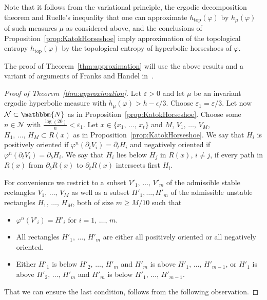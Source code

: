\documentclass[10pt,a4paper]{amsart}
\numberwithin{equation}{section}
\newcommand{\N}{\mathbbm{N}}
\newcommand{\topo}{\mathrm{top}}
\newcommand{\clN}{\mathcal{N}}
\theoremstyle{definition}
\theoremstyle{remark}
\begin{document}
Note that it follows from the variational principle, the ergodic decomposition theorem and Ruelle's inequality that one can approximate $h_{\topo}(\varphi)$ by $h_{\mu}(\varphi)$ of such measures $\mu$ as considered above, and the conclusions of Proposition~\ref{prop:KatokHorseshoe} imply approximation of the topological entropy $h_{\topo}(\varphi)$ by the topological entropy of hyperbolic horseshoes of $\varphi$.


The proof of Theorem~\ref{thm:approximation} will use the above results and a variant of arguments of Franks and Handel in~\cite{FranksHandel1988}.

\begin{proof}[Proof of Theorem~\ref{thm:approximation}]
Let $\varepsilon>0$ and let $\mu$ be an invariant ergodic hyperbolic measure with $h_{\mu}(\varphi) > h - \epsilon/3$. Choose $\varepsilon_1 = \varepsilon/3$. Let now $\clN\subset \N$ as in Proposition~\ref{prop:KatokHorseshoe}. Choose some $n\in \clN$ with $\frac{ \log(20)}{n} < \varepsilon_1$. Let $x \in \{x_1,\, \ldots,\, x_t\}$ and $M$, $V_1,\, \ldots,\, V_M$, $H_1,\, \ldots,\, H_M \subset R(x)$ as in Proposition~\ref{prop:KatokHorseshoe}. We say that $H_i$ is positively oriented if $\varphi^n(\partial_t V_i) = \partial_t H_i$ and negatively oriented if $\varphi^n(\partial_t V_i) = \partial_b H_i$. We say that $H_i$ lies below $H_j$ in $R(x)$, $i\neq j$, if every path in $R(x)$ from $\partial_b R(x)$ to $\partial_t R(x)$ intersects first $H_i$.


For convenience we restrict to a subset $V'_1,\, \ldots,\, V'_m$ of the admissible stable rectangles $V_1, \,\ldots,\, V_M$ as well as a subset $H'_1, \ldots, H'_m$ of the admissible unstable rectangles \linebreak $H_1,\, \ldots,\, H_M$, both of size $m\geq M/10$ such that
\begin{itemize}
\item $\varphi^n(V'_i) = H'_i$ for $i=1, \,\ldots,\, m$.
\item All rectangles $H'_1,\, \ldots,\, H'_m$ are either all positively oriented or all negatively oriented.
\item Either $H'_1$ is below $H'_2,\, \ldots,\, H'_{m}$ and $H'_m$ is above $H'_1,\, \ldots,\, H'_{m-1}$, or $H'_1$ is above $H'_2, \,\ldots,\, H'_{m}$ and $H'_m$ is below $H'_1, \,\ldots,\, H'_{m-1}$.
\end{itemize}

That we can ensure the last condition, follows from the following observation.


\end{proof}
\end{document}
